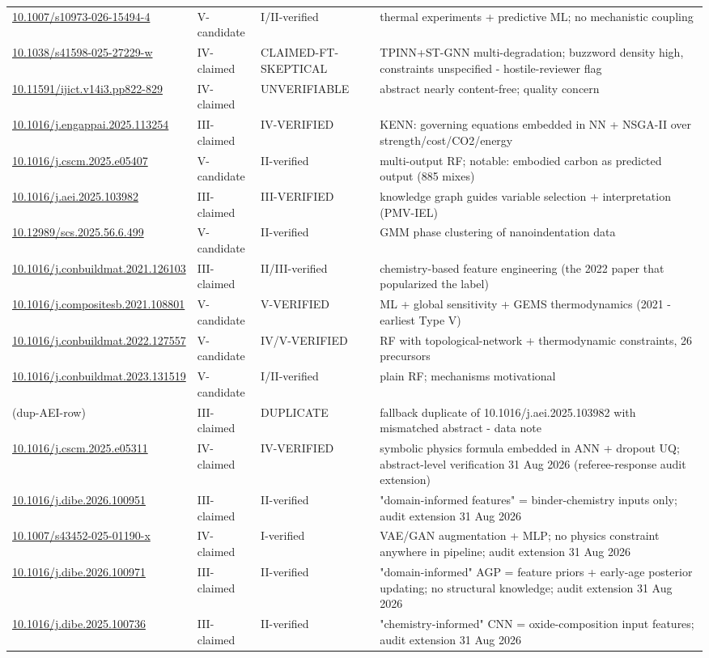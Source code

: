 \documentclass[pdflatex,sn-basic]{sn-jnl}
\begin{document}
{\begin{longtable}{p{}p{}p{}p{}}
\url{10.1007/s10973-026-15494-4} & V-candidate & I/II-verified & thermal experiments + predictive ML; no mechanistic coupling \\
\url{10.1038/s41598-025-27229-w} & IV-claimed & CLAIMED-FT-SKEPTICAL & TPINN+ST-GNN multi-degradation; buzzword density high, constraints unspecified - hostile-reviewer flag \\
\url{10.11591/ijict.v14i3.pp822-829} & IV-claimed & UNVERIFIABLE & abstract nearly content-free; quality concern \\
\url{10.1016/j.engappai.2025.113254} & III-claimed & IV-VERIFIED & KENN: governing equations embedded in NN + NSGA-II over strength/cost/CO2/energy \\
\url{10.1016/j.cscm.2025.e05407} & V-candidate & II-verified & multi-output RF; notable: embodied carbon as predicted output (885 mixes) \\
\url{10.1016/j.aei.2025.103982} & III-claimed & III-VERIFIED & knowledge graph guides variable selection + interpretation (PMV-IEL) \\
\url{10.12989/scs.2025.56.6.499} & V-candidate & II-verified & GMM phase clustering of nanoindentation data \\
\url{10.1016/j.conbuildmat.2021.126103} & III-claimed & II/III-verified & chemistry-based feature engineering (the 2022 paper that popularized the label) \\
\url{10.1016/j.compositesb.2021.108801} & V-candidate & V-VERIFIED & ML + global sensitivity + GEMS thermodynamics (2021 - earliest Type V) \\
\url{10.1016/j.conbuildmat.2022.127557} & V-candidate & IV/V-VERIFIED & RF with topological-network + thermodynamic constraints, 26 precursors \\
\url{10.1016/j.conbuildmat.2023.131519} & V-candidate & I/II-verified & plain RF; mechanisms motivational \\
(dup-AEI-row) & III-claimed & DUPLICATE & fallback duplicate of 10.1016/j.aei.2025.103982 with mismatched abstract - data note \\
\url{10.1016/j.cscm.2025.e05311} & IV-claimed & IV-VERIFIED & symbolic physics formula embedded in ANN + dropout UQ; abstract-level verification 31 Aug 2026 (referee-response audit extension) \\
\url{10.1016/j.dibe.2026.100951} & III-claimed & II-verified & "domain-informed features" = binder-chemistry inputs only; audit extension 31 Aug 2026 \\
\url{10.1007/s43452-025-01190-x} & IV-claimed & I-verified & VAE/GAN augmentation + MLP; no physics constraint anywhere in pipeline; audit extension 31 Aug 2026 \\
\url{10.1016/j.dibe.2026.100971} & III-claimed & II-verified & "domain-informed" AGP = feature priors + early-age posterior updating; no structural knowledge; audit extension 31 Aug 2026 \\
\url{10.1016/j.dibe.2025.100736} & III-claimed & II-verified & "chemistry-informed" CNN = oxide-composition input features; audit extension 31 Aug 2026 \\
\end{longtable}}
\end{document}
